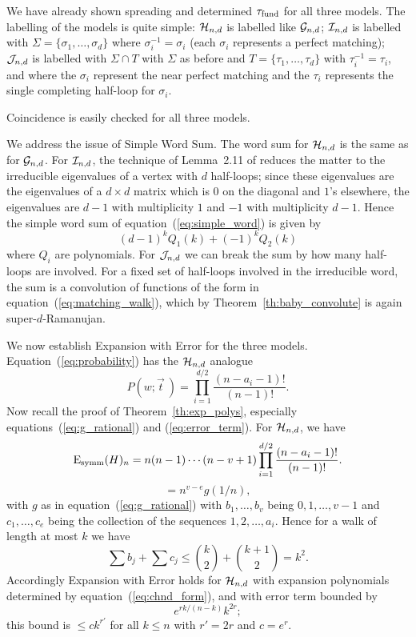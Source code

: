 \documentclass[12pt]{article}
\newcommand{\dtreelike}{{$d$-Ramanujan}}
\newcommand{\cg}{{\cal G}}
\newcommand{\ch}{{\cal H}}
\newcommand{\ci}{{\cal I}}
\newcommand{\cj}{{\cal J}}
\newcommand{\cjnd}{\cj_{n,d}}
\newcommand{\cind}{\ci_{n,d}}
\newcommand{\cgnd}{\cg_{n,d}}
\newcommand{\chnd}{\ch_{n,d}}
\newcommand{\fund}{{\rm fund}}
\newcommand{\taufund}{{\tau_\fund}}
\newcommand{\Esymm}{{\rm E}_{\rm symm}}
\begin{document}
We have already shown spreading and determined $\taufund$ for all
three models.  The labelling of the models is quite simple:
$\chnd$ is labelled like $\cgnd$; $\cind$ is labelled with
$\Sigma=\{\sigma_1,\ldots,\sigma_d\}$ where $\sigma_i^{-1}=\sigma_i$
(each $\sigma_i$ represents a perfect matching);
$\cjnd$ is labelled with $\Sigma\cap T$ with $\Sigma$ as before and
$T=\{\tau_1,\ldots,\tau_d\}$ with $\tau_i^{-1}=\tau_i$, and where
the $\sigma_i$ represent the near perfect matching and the $\tau_i$
represents the single completing half-loop for $\sigma_i$.

Coincidence is easily checked for all three models.

We address the issue of Simple Word Sum.  The word sum for $\chnd$
is the same as for $\cgnd$.  For $\cind$, the technique of Lemma~2.11
of \cite{friedman_random_graphs} reduces the matter to the irreducible
eigenvalues
of a vertex with $d$ half-loops; since these eigenvalues are the
eigenvalues of a $d\times d$ matrix which is $0$ on the diagonal and
$1$'s elsewhere, the eigenvalues are $d-1$ with multiplicity $1$ and
$-1$ with multiplicity $d-1$.  Hence the simple word sum of
equation~(\ref{eq:simple_word}) is given by 
\begin{equation}\label{eq:matching_walk}
(d-1)^k Q_1(k)+(-1)^k Q_2(k)
\end{equation}
where $Q_i$ are polynomials.
For $\cjnd$ we can break the sum by how many half-loops are involved.
For a fixed set of half-loops involved in the irreducible word,
the sum is a convolution of functions of the form in
equation~(\ref{eq:matching_walk}), which by Theorem~\ref{th:baby_convolute}
is again super-{\dtreelike}.


We now establish Expansion with Error for the three models.
Equation~(\ref{eq:probability}) has the $\chnd$ analogue
$$
P(w;\vec t\>) = \prod_{i=1}^{d/2} \frac{(n-a_i-1)!}{(n-1)!}.
$$
Now recall the proof of Theorem~\ref{th:exp_polys}, especially
equations~(\ref{eq:g_rational}) and (\ref{eq:error_term}).
For $\chnd$, we have
\begin{equation}\label{eq:chnd_form}
\Esymm(H)_n= n(n-1)\cdots(n-v+1)
\prod_{i=1}^{d/2} \frac{(n-a_i-1)!}{(n-1)!}.
\end{equation}
$$
= n^{v-e} g(1/n),
$$
with $g$ as in equation~(\ref{eq:g_rational})
with $b_1,\ldots,b_v$ being $0,1,\ldots,v-1$
and $c_1,\ldots,c_e$ being the collection of the sequences 
$1,2,\ldots,a_i$.  Hence for a walk of length at most $k$ we have
$$
\sum b_j+\sum c_j \le \binom{k}{2}+\binom{k+1}{2}=k^2.
$$
Accordingly Expansion with Error holds for $\chnd$ with expansion polynomials
determined by equation~(\ref{eq:chnd_form}), and with
error term bounded by
$$
e^{rk/(n-k)}k^{2r};
$$
this bound is $\le ck^{r'}$ for all $k\le n$ with $r'=2r$ and $c=e^r$.
\end{document}
